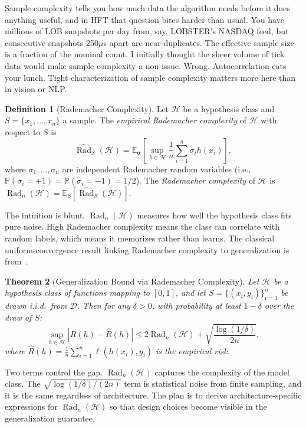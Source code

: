 \documentclass[11pt]{article}
\newtheorem{theorem}{Theorem}[section]
\theoremstyle{definition}
\newtheorem{definition}[theorem]{Definition}
\theoremstyle{remark}
\newcommand{\E}{\mathbb{E}}
\newcommand{\Prob}{\mathbb{P}}
\newcommand{\cH}{\mathcal{H}}
\newcommand{\cD}{\mathcal{D}}
\DeclareMathOperator{\Rad}{Rad}
\newcommand{\abs}[1]{\left\lvert #1 \right\rvert}
\begin{document}
Sample complexity tells you how much data the algorithm needs before it does anything useful, and in HFT that question bites harder than usual.
You have millions of LOB snapshots per day from, say, LOBSTER's NASDAQ feed, but consecutive snapshots 250$\mu$s apart are near-duplicates.
The effective sample size is a fraction of the nominal count.
I initially thought the sheer volume of tick data would make sample complexity a non-issue.
Wrong.
Autocorrelation eats your lunch.
Tight characterization of sample complexity matters more here than in vision or NLP.

\begin{definition}[Rademacher Complexity]\label{def:rademacher}
Let $\cH$ be a hypothesis class and $S = \{x_1, \ldots, x_n\}$ a sample.
The \emph{empirical Rademacher complexity} of $\cH$ with respect to $S$ is
\[
    \hat{\Rad}_S(\cH) = \E_{\boldsymbol{\sigma}}\!\left[ \sup_{h \in \cH} \frac{1}{n} \sum_{i=1}^{n} \sigma_i h(x_i) \right],
\]
where $\sigma_1, \ldots, \sigma_n$ are independent Rademacher random variables (i.e., $\Prob(\sigma_i = +1) = \Prob(\sigma_i = -1) = 1/2$).
The \emph{Rademacher complexity} of $\cH$ is $\Rad_n(\cH) = \E_S[\hat{\Rad}_S(\cH)]$.
\end{definition}

The intuition is blunt.
$\Rad_n(\cH)$ measures how well the hypothesis class fits pure noise.
High Rademacher complexity means the class can correlate with random labels, which means it memorizes rather than learns.
The classical uniform-convergence result linking Rademacher complexity to generalization is from~\citet{mohri2018foundations}.

\begin{theorem}[Generalization Bound via Rademacher Complexity]\label{thm:gen_bound}
Let $\cH$ be a hypothesis class of functions mapping to $[0,1]$, and let $S = \{(x_i, y_i)\}_{i=1}^n$ be drawn i.i.d.\ from $\cD$.
Then for any $\delta > 0$, with probability at least $1 - \delta$ over the draw of $S$:
\[
    \sup_{h \in \cH} \abs{R(h) - \hat{R}(h)} \leq 2\Rad_n(\cH) + \sqrt{\frac{\log(1/\delta)}{2n}},
\]
where $\hat{R}(h) = \frac{1}{n}\sum_{i=1}^n \ell(h(x_i), y_i)$ is the empirical risk.
\end{theorem}

Two terms control the gap.
$\Rad_n(\cH)$ captures the complexity of the model class.
The $\sqrt{\log(1/\delta)/(2n)}$ term is statistical noise from finite sampling, and it is the same regardless of architecture.
The plan is to derive architecture-specific expressions for $\Rad_n(\cH)$ so that design choices become visible in the generalization guarantee.
\end{document}
